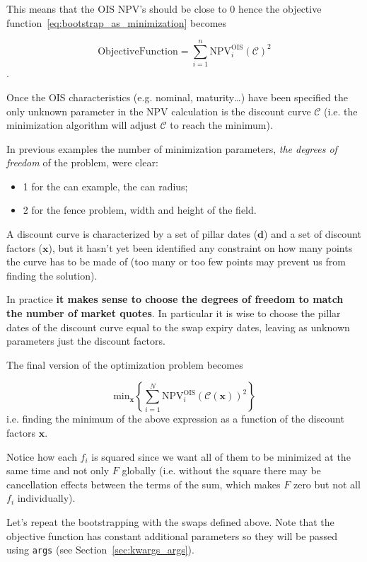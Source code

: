 This means that the OIS NPV's should be close to 0 hence the objective function~\ref{eq:bootstrap_as_minimization} becomes

\begin{equation}
\mathrm{Objective Function} = \sum_{i=1}^{n}\mathrm{NPV}^\mathrm{OIS}_i(\mathcal{C})^2
\end{equation}.

Once the OIS characteristics (e.g. nominal, maturity\ldots) have been specified the only unknown parameter in the NPV calculation is the discount
curve $\mathcal{C}$ (i.e. the minimization algorithm will adjust $\mathcal{C}$ to reach the minimum).

In previous examples the number of minimization parameters, \emph{the degrees of freedom} of the problem, were clear:
\begin{itemize}
\item 1 for the can example, the can radius;
\item 2 for the fence problem, width and height of the field.
\end{itemize}

A discount curve is characterized by a set of pillar dates ($\mathbf{d}$) and a set of discount factors ($\mathbf{x}$), but it hasn't yet been
identified any constraint on how many points the curve has to be made of (too many or too few points may prevent us from finding the solution).

In practice \textbf{it makes sense to choose the degrees of freedom to match the number of market quotes}. In particular it is wise to choose the pillar
dates of the discount curve equal to the swap expiry dates, leaving as unknown parameters just the discount factors.

The final version of the optimization problem becomes

\begin{equation}
 \mathrm{min}_{\mathbf{x}} \left\{\sum_{i=1}^{N}\mathrm{NPV}^\mathrm{OIS}_i( \mathcal{C}(\mathbf{x}))^2\right\}
\end{equation}
i.e. finding the minimum of the above expression as a function of the discount factors $\mathbf{x}$.

Notice how each $f_i$ is squared since we want all of them to be minimized at the same time and not only $F$ globally
(i.e. without the square there may be cancellation effects between the terms of the sum, which makes $F$ zero but not all $f_i$ individually).

Let's repeat the bootstrapping with the swaps defined above.
Note that the objective function has constant additional parameters so they will be passed using \texttt{args} (see Section~\ref{sec:kwargs_args}).

